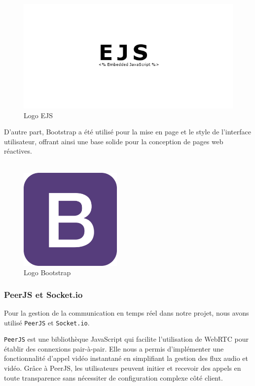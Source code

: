 \begin{figure}[H]
\begin{center}
\includegraphics[width=15cm]{assets/presentation/ejs.png}
\end{center}
\caption{Logo EJS}
\end{figure}

D'autre part, Bootstrap a été utilisé pour la mise en page et le style de l'interface utilisateur, offrant ainsi une base solide pour la conception de pages web réactives.\\\\

\begin{figure}[H]
\begin{center}
\includegraphics[width=5cm]{assets/presentation/Bootstrap_Logo-700x700.png}
\end{center}
\caption{Logo Bootstrap}
\end{figure}

\subsubsection*{PeerJS et Socket.io}  
Pour la gestion de la communication en temps réel dans notre projet, nous avons utilisé \verb|PeerJS| et \verb|Socket.io|.  

\verb|PeerJS| est une bibliothèque JavaScript qui facilite l'utilisation de WebRTC pour établir des connexions pair-à-pair. Elle nous a permis d'implémenter une fonctionnalité d'appel vidéo instantané en simplifiant la gestion des flux audio et vidéo. Grâce à PeerJS, les utilisateurs peuvent initier et recevoir des appels en toute transparence sans nécessiter de configuration complexe côté client.  

